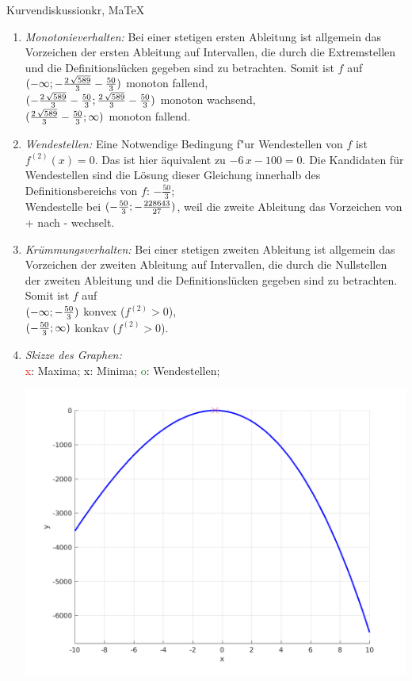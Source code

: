 \begin{MAufgabe}{Kurvendiskussion}{kr, MaTeX}
\begin{enumerate}
 \item \emph{Monotonieverhalten:} 
 Bei einer stetigen ersten Ableitung ist allgemein das Vorzeichen der ersten Ableitung auf Intervallen, die durch die Extremstellen und die Definitionsl\"ucken gegeben sind zu betrachten. Somit ist $f$ auf \\ 
 $(-\infty; - \frac{2\, \sqrt{589}}{3} - \frac{50}{3})$ monoton fallend, \\ 
 $( - \frac{2\, \sqrt{589}}{3} - \frac{50}{3};\frac{2\, \sqrt{589}}{3} - \frac{50}{3})$ monoton  wachsend, \\ 
 $(\frac{2\, \sqrt{589}}{3} - \frac{50}{3}; \infty)$ monoton fallend. \\ 
 \item \emph{Wendestellen:} 
 Eine Notwendige Bedingung f"ur Wendestellen von $f$ ist $f^{(2)}(x)=0$. 
 Das ist hier \"aquivalent zu $ - 6\, x - 100=0$. 
 Die Kandidaten f\"ur Wendestellen sind die L\"osung dieser Gleichung innerhalb des Definitionsbereichs von $f$: $- \frac{50}{3}$; \\ 
 Wendestelle bei $(- \frac{50}{3};- \frac{228643}{27})$, weil die zweite Ableitung das Vorzeichen von + nach - wechselt. \\ 
 \item \emph{Kr\"ummungsverhalten:} 
 Bei einer stetigen zweiten Ableitung ist allgemein das Vorzeichen der zweiten Ableitung auf Intervallen, die durch die Nullstellen der zweiten Ableitung und die Definitionsl\"ucken gegeben sind zu betrachten. 
 Somit ist $f$ auf \\ 
 $(-\infty ;- \frac{50}{3})$  konvex ($f^{(2)}>0$), \\ 
 $(- \frac{50}{3}; \infty)$  konkav ($f^{(2)}>0$). \\ 
 \item \emph{Skizze des Graphen:} \\ 
 {\textcolor{red} x}: Maxima; {\textcolor{black} x}: Minima; {\textcolor{green} o}: Wendestellen; 
  \begin{center}
  \includegraphics[width=0.8\linewidth]{Abb_zur_Ag_autogenerated_fractions_21.png} \end{center}
  
 \end{enumerate}
 \else\relax\fi
  \end{MAufgabe}
